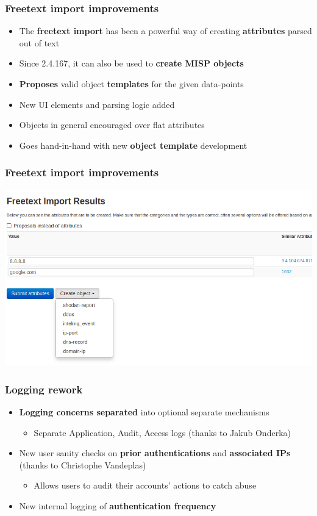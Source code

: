 \begin{frame}
  \frametitle{Freetext import improvements}
  \begin{itemize}
      \item The {\bf freetext import} has been a powerful way of creating {\bf attributes} parsed out of text
      \item Since 2.4.167, it can also be used to {\bf create MISP objects }
      \item {\bf Proposes} valid object {\bf templates} for the given data-points
      \item New UI elements and parsing logic added
      \item Objects in general encouraged over flat attributes
      \item Goes hand-in-hand with new {\bf object template} development
  \end{itemize}
\end{frame}

\begin{frame}
\frametitle{Freetext import improvements}
\begin{center}
\includegraphics[scale=0.40]{images/freetext_objects.png}
\end{center}
\end{frame}


\begin{frame}
  \frametitle{Logging rework}
  \begin{itemize}
     \item {\bf Logging concerns separated} into optional separate mechanisms
     \begin{itemize}
         \item Separate Application, Audit, Access logs (thanks to Jakub Onderka)
     \end{itemize}
     \item New user sanity checks on {\bf prior authentications} and {\bf associated IPs} (thanks to Christophe Vandeplas)
     \begin{itemize}
         \item Allows users to audit their accounts' actions to catch abuse
     \end{itemize}
     \item New internal logging of {\bf authentication frequency}
  \end{itemize}
\end{frame}

